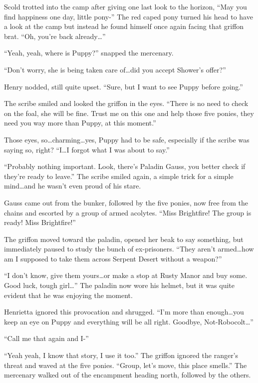 Scold trotted into the camp after giving one last look to the horizon, ``May you find happiness one day, little pony-'' The red caped pony turned his head to have a look at the camp but instead he found himself once again facing that griffon brat. ``Oh, you're back already\dots''

``Yeah, yeah, where is Puppy?'' snapped the mercenary.

``Don't worry, she is being taken care of\dots did you accept Shower's offer?''

Henry nodded, still quite upset. ``Sure, but I want to see Puppy before going.''

The scribe smiled and looked the griffon in the eyes. ``There is no need to check on the foal, she will be fine. Trust me on this one and help those five ponies, they need you way more than Puppy, at this moment.''

Those eyes, so\dots charming\dots yes, Puppy had to be safe, especially if the scribe was saying so, right? ``I\dots I forgot what I was about to say.''

``Probably nothing important. Look, there's Paladin Gauss, you better check if they're ready to leave.'' The scribe smiled again, a simple trick for a simple mind\dots and he wasn't even proud of his stare.

Gauss came out from the bunker, followed by the five ponies, now free from the chains and escorted by a group of armed acolytes. ``Miss Brightfire! The group is ready! Miss Brightfire!''

The griffon moved toward the paladin, opened her beak to say something, but immediately paused to study the bunch of ex-prisoners. ``They aren't armed\dots how am I supposed to take them across Serpent Desert without a weapon?''

``I don't know, give them yours\dots or make a stop at Rusty Manor and buy some. Good luck, tough girl\dots'' The paladin now wore his helmet, but it was quite evident that he was enjoying the moment.

Henrietta ignored this provocation and shrugged. ``I'm more than enough\dots you keep an eye on Puppy and everything will be all right. Goodbye, Not-Robocolt\dots''

``Call me that again and I-''

``Yeah yeah, I know that story, I use it too.'' The griffon ignored the ranger's threat and waved at the five ponies. ``Group, let's move, this place smells.'' The mercenary walked out of the encampment heading north, followed by the others.

